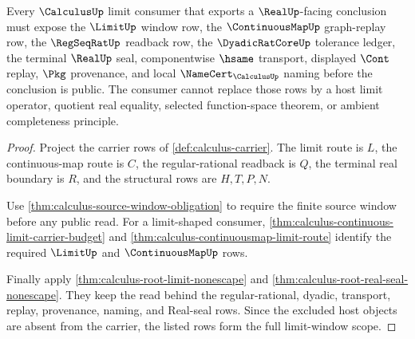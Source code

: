 \begin{theorem}
\label{thm:calculus-root-unblock-limit-window-scope}
Every $\CalculusUp$ limit consumer that exports a $\RealUp$-facing conclusion must expose the $\LimitUp$ window row, the $\ContinuousMapUp$ graph-replay row, the $\RegSeqRatUp$ readback row, the $\DyadicRatCoreUp$ tolerance ledger, the terminal $\RealUp$ seal, componentwise $\hsame$ transport, displayed $\Cont$ replay, $\Pkg$ provenance, and local $\NameCert_{\CalculusUp}$ naming before the conclusion is public. The consumer cannot replace those rows by a host limit operator, quotient real equality, selected function-space theorem, or ambient completeness principle.
\end{theorem}
\begin{proof}
Project the carrier rows of \autoref{def:calculus-carrier}. The limit route is $L$, the continuous-map route is $C$, the regular-rational readback is $Q$, the terminal real boundary is $R$, and the structural rows are $H,T,P,N$.

Use \autoref{thm:calculus-source-window-obligation} to require the finite source window before any public read. For a limit-shaped consumer, \autoref{thm:calculus-continuous-limit-carrier-budget} and \autoref{thm:calculus-continuousmap-limit-route} identify the required $\LimitUp$ and $\ContinuousMapUp$ rows.

Finally apply \autoref{thm:calculus-root-limit-nonescape} and \autoref{thm:calculus-root-real-seal-nonescape}. They keep the read behind the regular-rational, dyadic, transport, replay, provenance, naming, and Real-seal rows. Since the excluded host objects are absent from the carrier, the listed rows form the full limit-window scope.
\end{proof}

